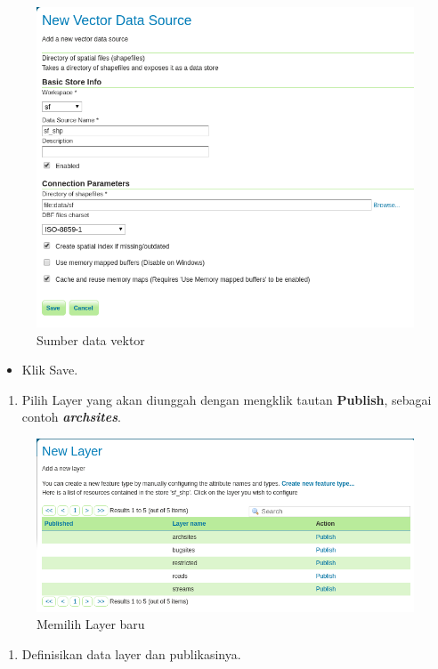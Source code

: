 \documentclass[]{book}
\providecommand{\tightlist}{%
  \setlength{\itemsep}{0pt}\setlength{\parskip}{0pt}}
\begin{document}
\begin{figure}

{\centering \includegraphics[width=0.6\linewidth]{images/08/gs15} 

}

\caption{Sumber data vektor}\label{fig:gs15}
\end{figure}

\begin{itemize}
\tightlist
\item
  Klik Save.
\end{itemize}

\begin{enumerate}
\def\labelenumi{\arabic{enumi}.}
\setcounter{enumi}{2}
\tightlist
\item
  Pilih Layer yang akan diunggah dengan mengklik tautan \textbf{Publish}, sebagai contoh \textbf{\emph{archsites}}.
\end{enumerate}

\begin{figure}

{\centering \includegraphics[width=0.6\linewidth]{images/08/gs16} 

}

\caption{Memilih Layer baru}\label{fig:gs16}
\end{figure}

\begin{enumerate}
\def\labelenumi{\arabic{enumi}.}
\setcounter{enumi}{3}
\tightlist
\item
  Definisikan data layer dan publikasinya.
\end{enumerate}
\end{document}
